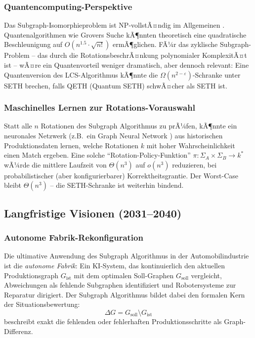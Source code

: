 ﻿\documentclass[a4paper,12pt]{article}
\theoremstyle{definition}
\begin{document}
\subsubsection{Quantencomputing-Perspektive}

Das Subgraph-Isomorphieproblem ist NP-vollstÃ¤ndig im Allgemeinen \cite{cook1971complexity}.
Quantenalgorithmen wie Grovers Suche \cite{grover1996fast} kÃ¶nnten theoretisch eine
quadratische Beschleunigung auf $O(n^{1.5} \cdot \sqrt{n!})$ ermÃ¶glichen. FÃ¼r das
zyklische Subgraph-Problem -- das durch die RotationsbeschrÃ¤nkung polynomialer KomplexitÃ¤t
ist -- wÃ¤re ein Quantenvorteil weniger dramatisch, aber dennoch relevant:
Eine Quantenversion des LCS-Algorithmus kÃ¶nnte die $\Omega(n^{2-\varepsilon})$-Schranke
unter SETH brechen, falls QETH (Quantum SETH) schwÃ¤cher als SETH ist.

\subsubsection{Maschinelles Lernen zur Rotations-Vorauswahl}

Statt alle $n$ Rotationen des Subgraph Algorithmus zu prÃ¼fen, kÃ¶nnte ein neuronales Netzwerk
(z.B.\ ein Graph Neural Network \cite{wu2020gnn}) aus historischen Produktionsdaten lernen,
welche Rotationen $k$ mit hoher Wahrscheinlichkeit einen Match ergeben. Eine solche
``Rotation-Policy-Funktion'' $\pi: \Sigma_A \times \Sigma_B \to k^*$ wÃ¼rde die mittlere
Laufzeit von $\Theta(n^3)$ auf $o(n^3)$ reduzieren, bei probabilistischer (aber konfigurierbarer)
Korrektheitsgrantie. Der Worst-Case bleibt $\Theta(n^3)$ -- die SETH-Schranke ist weiterhin bindend.

\subsection{Langfristige Visionen (2031--2040)}

\subsubsection{Autonome Fabrik-Rekonfiguration}

Die ultimative Anwendung des Subgraph Algorithmus in der Automobilindustrie ist die
\emph{autonome Fabrik}: Ein KI-System, das kontinuierlich den aktuellen Produktionsgraph
$G_{\mathrm{ist}}$ mit dem optimalen Soll-Graphen $G_{\mathrm{soll}}$ vergleicht,
Abweichungen als fehlende Subgraphen identifiziert und Robotersysteme zur Reparatur dirigiert.
Der Subgraph Algorithmus bildet dabei den formalen Kern der Situationsbewertung:
\[
\Delta G = G_{\mathrm{soll}} \setminus G_{\mathrm{ist}}
\]
beschreibt exakt die fehlenden oder fehlerhaften Produktionsschritte als Graph-Differenz.
\end{document}
